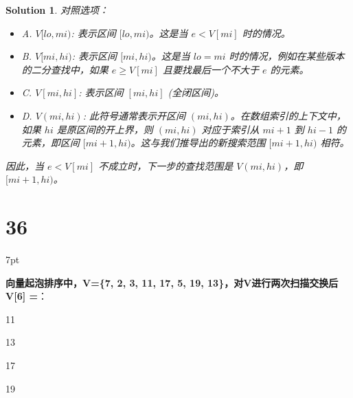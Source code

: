\documentclass[UTF8]{report}
\newtheorem{solution}{Solution}
\theoremstyle{MyLineTheoremStyle} %
\theoremstyle{MyBlockTheoremStyle} %
\theoremstyle{MySubsubsectionStyle} %
\newenvironment{graybox}{%
        \def\FrameCommand{%
        \hspace{1pt}%
        {\color{gray}\small \vrule width 2pt}%
        {\color{graybox_color}\vrule width 4pt}%
        \colorbox{graybox_color}%
        }%
        \MakeFramed{\advance\hsize-\width\FrameRestore}%
        \noindent\hspace{-4.55pt}%
        \begin{adjustwidth}{}{7pt}%
        \vspace{2pt}\vspace{2pt}%
        }
        {%
        \vspace{2pt}\end{adjustwidth}\endMakeFramed%
        }
\begin{document}
\begin{solution}
对照选项：
\begin{itemize}
    \item A. $V[lo, mi)$: 表示区间 $[lo, mi)$。这是当 $e < V[mi]$ 时的情况。
    \item B. $V[mi, hi)$: 表示区间 $[mi, hi)$。这是当 $lo = mi$ 时的情况，例如在某些版本的二分查找中，如果 $e \ge V[mi]$ 且要找最后一个不大于 $e$ 的元素。
    \item C. $V[mi, hi]$: 表示区间 $[mi, hi]$ (全闭区间)。
    \item D. $V(mi, hi)$: 此符号通常表示开区间 $(mi, hi)$。在数组索引的上下文中，如果 $hi$ 是原区间的开上界，则 $(mi, hi)$ 对应于索引从 $mi+1$ 到 $hi-1$ 的元素，即区间 $[mi+1, hi)$。这与我们推导出的新搜索范围 $[mi+1, hi)$ 相符。
\end{itemize}
因此，当 $e<V[mi]$ 不成立时，下一步的查找范围是 $V(mi, hi)$，即 $[mi+1, hi)$。
\end{solution}



\section*{36}

\begin{graybox}
\textbf{向量起泡排序中，V=\{7, 2, 3, 11, 17, 5, 19, 13\}，对V进行两次扫描交换后V[6] =}：
\begin{circledenum}
    \item 11
    \item 13
    \item 17
    \item 19
\end{circledenum}
\end{graybox}
\end{document}
